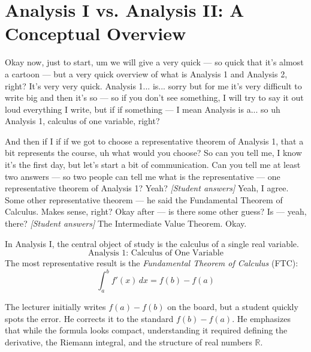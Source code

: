 \section{Analysis I vs. Analysis II: A Conceptual Overview}

\begin{spoken-clean}[00:04:15 - 00:05:30]
Okay now, just to start, um we will give a very quick --- so quick that it's almost a cartoon --- but a very quick overview of what is Analysis 1 and Analysis 2, right? It's very very quick. Analysis 1... is... sorry but for me it's very difficult to write big and then it's so --- so if you don't see something, I will try to say it out loud everything I write, but if if something --- I mean Analysis is a... so uh Analysis 1, calculus of one variable, right? 

And then if I if if we got to choose a representative theorem of Analysis 1, that a bit represents the course, uh what would you choose? So can you tell me, I know it's the first day, but let's start a bit of communication. Can you tell me at least two answers --- so two people can tell me what is the representative --- one representative theorem of Analysis 1? Yeah? \textit{[Student answers]} Yeah, I agree. Some other representative theorem --- he said the Fundamental Theorem of Calculus. Makes sense, right? Okay after --- is there some other guess? Is --- yeah, there? \textit{[Student answers]} The Intermediate Value Theorem. Okay.
\end{spoken-clean}

\begin{math-stroke}
In Analysis I, the central object of study is the calculus of a single real variable.
\[
\text{Analysis 1: Calculus of One Variable}
\]
The most representative result is the \emph{Fundamental Theorem of Calculus} (FTC):
\begin{equation} \label{eq:ftc_1d}
\int_a^b f'(x) \, dx = f(b) - f(a)
\end{equation}

\begin{explanation-of-steps}
The lecturer initially writes $f(a) - f(b)$ on the board, but a student quickly spots the error. He corrects it to the standard $f(b) - f(a)$. He emphasizes that while the formula looks compact, understanding it required defining the derivative, the Riemann integral, and the structure of real numbers $\mathbb{R}$.
\end{explanation-of-steps}
\end{math-stroke}

